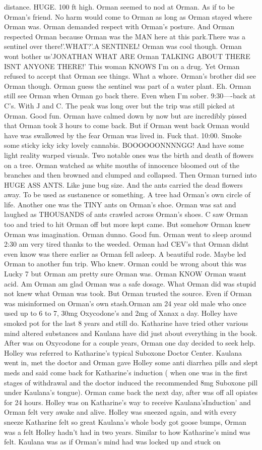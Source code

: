 \documentclass[12pt]{book}
\begin{document}
distance. HUGE. 100 ft high. Orman seemed to nod at Orman. As if to be Orman's friend. No harm would come to Orman as long as Orman stayed where Orman was. Orman demanded respect with Orman's posture. And Orman respected Orman because Orman was the MAN here at this park.There was a sentinel over there!'.WHAT?'.A SENTINEL! Orman was cool though. Orman wont bother us'JONATHAN WHAT ARE Orman TALKING ABOUT THERE ISNT ANYONE THERE!' This woman KNOWS I'm on a drug. Yet Orman refused to accept that Orman see things. What a whore. Orman's brother did see Orman though. Orman guess the sentinel was part of a water plant. Eh. Orman still see Orman when Orman go back there. Even when I'm sober. 9:30----back at C's. With J and C. The peak was long over but the trip was still picked at Orman. Good fun. Orman have calmed down by now but are incredibly pissed that Orman took 3 hours to come back. But if Orman went back Orman would have was swallowed by the fear Orman was lived in. Fuck that. 10:00. Smoke some sticky icky icky lovely cannabis. BOOOOOONNNNGG! And have some light reality warped visuals. Two notable ones was the birth and death of flowers on a tree. Orman watched as white mouths of innocence bloomed out of the branches and then browned and clumped and collapsed. Then Orman turned into HUGE ASS ANTS. Like june bug size. And the ants carried the dead flowers away. To be used as sustanence or something. A tree had Orman's own circle of life. Another one was the TINY ants on Orman's shoe. Orman was sat and laughed as THOUSANDS of ants crawled across Orman's shoes. C saw Orman too and tried to hit Orman off but more kept came. But somehow Orman knew Orman was imagination. Orman dunno. Good fun. Orman went to sleep around 2:30 am very tired thanks to the weeded. Orman had CEV's that Orman didnt even know was there earlier as Orman fell asleep. A beautiful rode. Maybe led Orman to another fun trip. Who knew. Orman could be wrong about this was Lucky 7 but Orman am pretty sure Orman was. Orman KNOW Orman wasnt acid. Am Orman am glad Orman was a safe dosage. What Orman did was stupid not knew what Orman was took. But Orman trusted the source. Even if Orman was misinformed on Orman's own stash.Orman am 24 year old male who once used up to 6 to 7, 30mg Oxycodone's and 2mg of Xanax a day. Holley have smoked pot for the last 8 years and still do. Katharine have tried other various mind altered substances and Kaulana have did just about everything in the book. After was on Oxycodone for a couple years, Orman one day decided to seek help. Holley was referred to Katharine's typical Suboxone Doctor Center. Kaulana went in, met the doctor and Orman gave Holley some anti diarrhea pills and slept meds and said come back for Katharine's induction ( when one was in the first stages of withdrawal and the doctor induced the recommended 8mg Suboxone pill under Kaulana's tongue). Orman came back the next day, after was off all opiates for 24 hours. Holley was on Katharine's way to receive Kaulana'sInduction' and Orman felt very awake and alive. Holley was sneezed again, and with every sneeze Katharine felt so great Kaulana's whole body got goose bumps, Orman was a felt Holley hadn't had in two years. Similar to how Katharine's mind was felt. Kaulana was as if Orman's mind had was locked up and stuck on 
\end{document}
